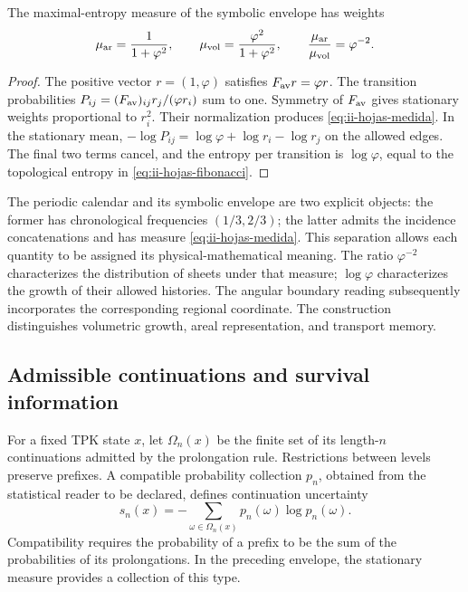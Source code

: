 \begin{proposition}
The maximal-entropy measure of the symbolic envelope has weights
\begin{equation}
 \mu_{\rm ar}=\frac{1}{1+\varphi^2},\qquad
 \mu_{\rm vol}=\frac{\varphi^2}{1+\varphi^2},\qquad
 \frac{\mu_{\rm ar}}{\mu_{\rm vol}}=\varphi^{-2}.
 \label{eq:ii-hojas-medida}
\end{equation}
\end{proposition}
\begin{proof}
The positive vector \(r=(1,\varphi)\) satisfies
\(F_{\rm av}r=\varphi r\). The transition probabilities
\(P_{ij}=(F_{\rm av})_{ij}r_j/(\varphi r_i)\) sum to one.
Symmetry of \(F_{\rm av}\) gives stationary weights proportional
to \(r_i^2\). Their normalization produces
\eqref{eq:ii-hojas-medida}. In the stationary mean,
\(-\log P_{ij}=\log\varphi+\log r_i-\log r_j\) on the
allowed edges. The final two terms cancel, and the
entropy per transition is \(\log\varphi\), equal to the topological
entropy in \eqref{eq:ii-hojas-fibonacci}.
\end{proof}

The periodic calendar and its symbolic envelope are two
explicit objects: the former has chronological frequencies
\((1/3,2/3)\); the latter admits the incidence concatenations
and has measure \eqref{eq:ii-hojas-medida}. This separation allows
each quantity to be assigned its physical-mathematical meaning. The ratio
\(\varphi^{-2}\) characterizes the distribution of sheets under that
measure; \(\log\varphi\) characterizes the growth of their
allowed histories. The angular boundary reading subsequently incorporates the
corresponding regional coordinate. The construction distinguishes
volumetric growth, areal representation, and transport memory.

\subsection{Admissible continuations and survival information}
\label{sec:ii-informacion-supervivencia}

For a fixed TPK state \(x\), let \(\Omega_n(x)\) be the finite set
of its length-\(n\) continuations admitted by the prolongation
rule. Restrictions between levels preserve prefixes.
A compatible probability collection \(p_n\), obtained from the
statistical reader to be declared, defines continuation
uncertainty
\begin{equation}
 s_n(x)=-\sum_{\omega\in\Omega_n(x)}
                 p_n(\omega)\log p_n(\omega).
 \label{eq:ii-entropia-continuaciones}
\end{equation}
Compatibility requires the probability of a prefix to be the sum
of the probabilities of its prolongations. In the preceding envelope,
the stationary measure provides a collection of this type.


